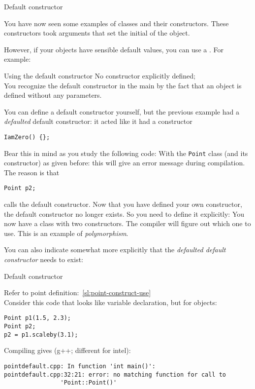  {Default constructor}
\label{sec:default-constructor}

You have now seen some examples of classes and their constructors.
These constructors took arguments that set the initial  of the object.

However, if your objects have sensible default values, you can use a
.
For example:

\begin{block}{Using the default constructor}
  \label{sl:no-construct-default}
  No constructor explicitly defined;\\
  You recognize the default constructor in the main by the fact that an object
  is defined without any parameters.

\end{block}

You can define a default constructor yourself,
but the previous example had a
\emph{defaulted} default constructor:
it acted like it had a constructor
\begin{lstlisting}
IamZero() {};
\end{lstlisting}

Bear this in mind as you study the following code:
%
%
With the \lstinline{Point} class (and its constructor) as given before:
this will give an error message during compilation. The reason is
that 
\begin{lstlisting}
Point p2;
\end{lstlisting}
calls the default constructor. Now that you have defined your own
constructor, the default constructor no longer exists. So you need to
define it explicitly:
%
%
You now have a class with two constructors.
The compiler will figure out which one to use.
This is an example of \emph{polymorphism}.

You can also indicate somewhat more explicitly that the
\emph{defaulted default constructor} 
needs to exist:

\begin{slide}{Default constructor}
  \label{sl:obj-def-construct1}

  Refer to point definition:~\ref{sl:point-construct-use}\\
  Consider this code that looks like variable declaration,
  but for objects:
\begin{lstlisting}
Point p1(1.5, 2.3);
Point p2;
p2 = p1.scaleby(3.1);
\end{lstlisting}

  Compiling gives (g++; different for intel):
\begin{lstlisting}
pointdefault.cpp: In function 'int main()':
pointdefault.cpp:32:21: error: no matching function for call to
                'Point::Point()'
\end{lstlisting}
\end{slide}

